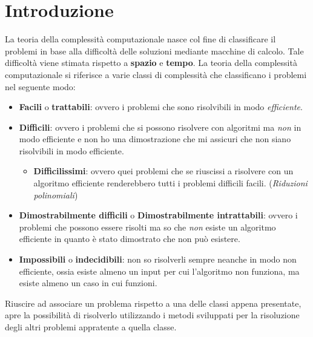 \chapter{Introduzione}
La teoria della complessità computazionale nasce col fine di classificare il problemi
in base alla difficoltà delle soluzioni mediante macchine di calcolo. Tale
difficoltà viene stimata rispetto a \textbf{spazio} e \textbf{tempo}. La teoria
della complessità computazionale si riferisce a varie classi di complessità che
classificano i problemi nel seguente modo:
\begin{itemize}
    \item \textbf{Facili} o \textbf{trattabili}: ovvero i problemi che sono
          risolvibili in modo \textit{efficiente}.
    \item \textbf{Difficili}: ovvero i problemi che si possono risolvere con
          algoritmi ma \textit{non} in modo efficiente e non ho una dimostrazione che
          mi assicuri che non siano risolvibili in modo efficiente.
          \begin{itemize}
              \item \textbf{Difficilissimi}: ovvero quei problemi che se riuscissi a
                    risolvere con un algoritmo efficiente renderebbero tutti i problemi difficili
                    facili. (\textit{Riduzioni polinomiali})
          \end{itemize}
    \item \textbf{Dimostrabilmente difficili} o \textbf{Dimostrabilmente intrattabili}:
          ovvero i problemi che possono essere risolti ma so che \textit{non} esiste un
          algoritmo efficiente in quanto è stato dimostrato che non può esistere.
    \item \textbf{Impossibili} o \textbf{indecidibili}: non so risolverli sempre
          neanche in modo non efficiente, ossia esiste almeno un input per cui l'algoritmo
          non funziona, ma esiste almeno un caso in cui funzioni.
\end{itemize}

Riuscire ad associare un problema rispetto a una delle classi appena presentate,
apre la possibilità di risolverlo utilizzando i metodi sviluppati per la risoluzione
degli altri problemi appratente a quella classe.

